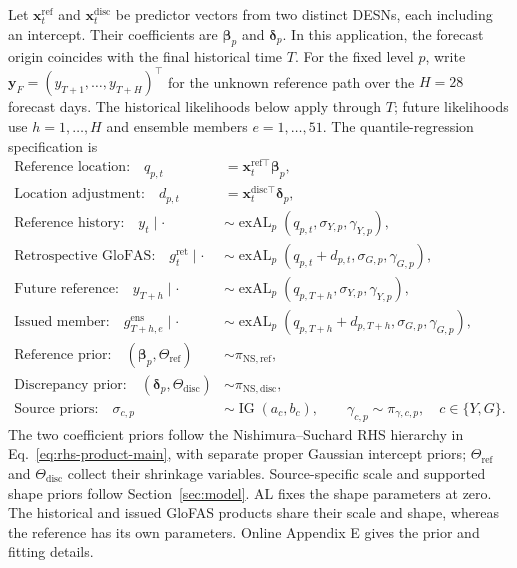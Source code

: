 \documentclass[12pt,letterpaper]{article}
\numberwithin{equation}{section}
\newcommand{\vect}[1]{\bm{#1}}
\DeclareMathOperator{\IG}{IG}
\newcommand{\exAL}{\operatorname{exAL}}
\begin{document}
Let \(\vect x_t^{\mathrm{ref}}\) and \(\vect x_t^{\mathrm{disc}}\) be
predictor vectors from two distinct DESNs, each including an intercept.
Their coefficients are \(\vect\beta_p\) and \(\vect\delta_p\).
In this application, the forecast origin coincides with the final historical
time \(T\). For the fixed level \(p\), write
\(\vect y_F=(y_{T+1},\ldots,y_{T+H})^\top\) for the unknown reference path
over the \(H=28\) forecast days. The historical likelihoods below apply
through \(T\); future likelihoods use \(h=1,\ldots,H\) and ensemble
members \(e=1,\ldots,51\). The quantile-regression specification is
\begin{equation}
\begin{aligned}
\text{Reference location:}\quad
q_{p,t}&=\vect x_t^{\mathrm{ref}\top}\vect\beta_p,\\
\text{Location adjustment:}\quad
d_{p,t}&=\vect x_t^{\mathrm{disc}\top}\vect\delta_p,\\
\text{Reference history:}\quad
y_t\mid\cdot&\sim\exAL_p(q_{p,t},\sigma_{Y,p},\gamma_{Y,p}),\\
\text{Retrospective GloFAS:}\quad
g_t^{\mathrm{ret}}\mid\cdot&\sim
\exAL_p(q_{p,t}+d_{p,t},\sigma_{G,p},\gamma_{G,p}),\\
\text{Future reference:}\quad
y_{T+h}\mid\cdot&\sim
\exAL_p(q_{p,T+h},\sigma_{Y,p},\gamma_{Y,p}),\\
\text{Issued member:}\quad
g_{T+h,e}^{\mathrm{ens}}\mid\cdot&\sim
\exAL_p(q_{p,T+h}+d_{p,T+h},\sigma_{G,p},\gamma_{G,p}),\\
\text{Reference prior:}\quad
(\vect\beta_p,\Theta_{\mathrm{ref}})&\sim\pi_{\mathrm{NS,ref}},\\
\text{Discrepancy prior:}\quad
(\vect\delta_p,\Theta_{\mathrm{disc}})&\sim\pi_{\mathrm{NS,disc}},\\
\text{Source priors:}\quad
\sigma_{c,p}&\sim\IG(a_c,b_c),\qquad
\gamma_{c,p}\sim\pi_{\gamma,c,p},\quad c\in\{Y,G\}.
\end{aligned}
\label{eq:glofas-part4-main}
\end{equation}
The two coefficient priors follow the Nishimura--Suchard RHS hierarchy in
Eq.~\eqref{eq:rhs-product-main}, with separate proper Gaussian intercept
priors; \(\Theta_{\mathrm{ref}}\) and \(\Theta_{\mathrm{disc}}\) collect
their shrinkage variables. Source-specific scale and supported shape priors
follow Section~\ref{sec:model}. AL fixes the shape parameters at zero.
The historical and issued GloFAS products share their scale and shape,
whereas the reference has its own parameters. Online Appendix E gives the
prior and fitting details.
\end{document}
